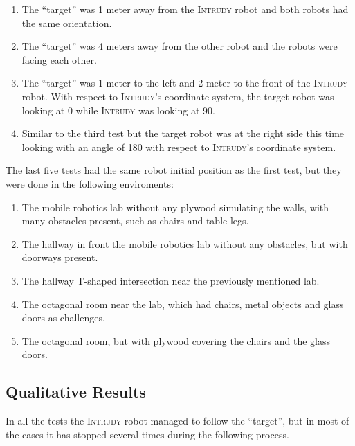 \documentclass[12pt,a4paper]{scrartcl}
\newcommand{\intrudy}{\textsc{Intrudy}\xspace}
\newcommand{\degrees}{\textdegree\xspace}
\begin{document}
	\begin{enumerate}
		\item The ``target'' was 1 meter away from the \intrudy robot and both robots had the same orientation.
		\item The ``target'' was 4 meters away from the other robot and the robots were facing each other.
		\item The ``target'' was 1 meter to the left and 2 meter to the front of the \intrudy robot. With respect to \intrudy's coordinate system, the target robot was looking at 0\degrees while \intrudy was looking
		at 90\degrees.
		\item Similar to the third test but the target robot was at the right side this time looking with an angle of 180\degrees with respect to \intrudy's coordinate system.
	\end{enumerate}
	
	The last five tests had the same robot initial position as the first test, but they were done in the following enviroments:
	
	\begin{enumerate}[start=5]
		\item The mobile robotics lab without any plywood simulating the walls, with many obstacles present, such as chairs and table legs.
		\item The hallway in front the mobile robotics lab without any obstacles, but with doorways present. 
		\item The hallway T-shaped intersection near the previously mentioned lab.
		\item The octagonal room near the lab, which had chairs, metal objects and glass doors as challenges.
		\item The octagonal room, but with plywood covering the chairs and the glass doors.
	\end{enumerate}


	\subsection{Qualitative Results} %
	\label{sub:qualitative_results}
	
		In all the tests the \intrudy robot managed to follow the ``target'', but in most of the cases it has stopped several times during the following process. 
\end{document}
